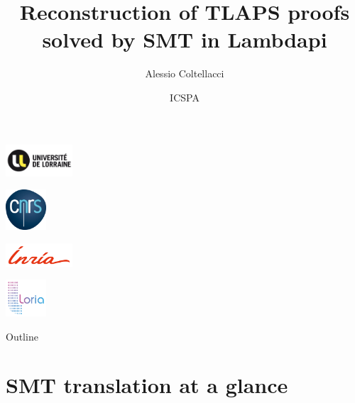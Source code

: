 \documentclass[aspectratio=169,xcolor={dvipsnames}]{beamer}
\title{Reconstruction of TLAPS proofs\\ solved by SMT in Lambdapi}
\author[A.~Colt]{%
  Alessio Coltellacci
}
\institute[]{\small%
  Univ. Lorraine, CNRS, Inria, Loria
}
\date[]{%
  ICSPA
}
\begin{document}
\begin{frame}
  \titlepage
  \centering
    \begin{minipage}{.18\textwidth}
        \includegraphics[width=2.5cm]{ul_logo.png}
    \end{minipage}%
    \begin{minipage}{.12\textwidth}
        \includegraphics[width=1.5cm]{cnrs.png}
    \end{minipage}%
    \begin{minipage}{.18\textwidth}
        \includegraphics[width=2.5cm]{inria-logo.png}
    \end{minipage}%
    \begin{minipage}{.12\textwidth}
        \includegraphics[width=1.5cm]{loria-logo.png}
    \end{minipage}%
\end{frame}

\begin{frame}{Outline}
    \tableofcontents
\end{frame}

\section{SMT translation at a glance}

\AtBeginSection[]
{
  \begin{frame}
    \tableofcontents[currentsection]
  \end{frame}
}
\end{document}
